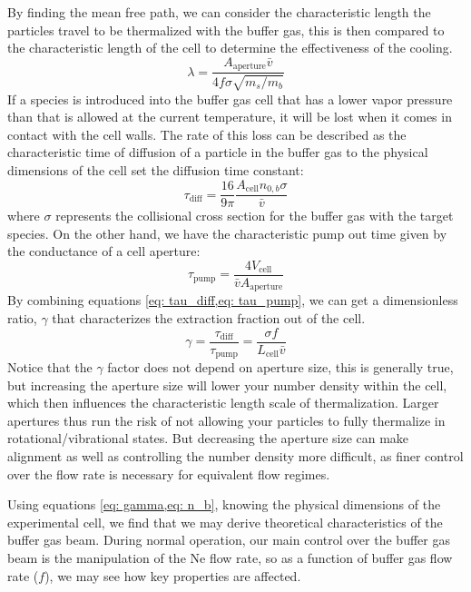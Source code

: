 By finding the mean free path, we can consider the characteristic length the particles travel to be thermalized with the buffer gas, this is then compared to the characteristic length of the cell to determine the effectiveness of the cooling.
\begin{equation*}
	\lambda = \frac{A_{\mathrm{aperture}} \bar{v}}{4 f \sigma \sqrt{m_s/m_b}}
\end{equation*}
If a species is introduced into the buffer gas cell that has a lower vapor pressure than that is allowed at the current temperature, it will be lost when it comes in contact with the cell walls. The rate of this loss can be described as the  characteristic time of diffusion of a particle in the buffer gas to the physical dimensions of the cell set the diffusion time constant:
\begin{equation}
	\tau_{\mathrm{diff}} = \frac{16}{9 \pi} \frac{A_{\mathrm{cell}} n_{0,b} \sigma}{\bar{v}} \label{eq: tau_diff}
\end{equation}
where $\sigma$ represents the collisional cross section for the buffer gas with the target species. On the other hand, we have the characteristic pump out time given by the conductance of a cell aperture:
\begin{equation}
	\tau_{\mathrm{pump}}=\frac{4V_{\mathrm{cell}}}{\bar{v}A_{\mathrm{aperture}}} \label{eq: tau_pump}
\end{equation}
By combining equations \cref{eq: tau_diff,eq: tau_pump}, we can get a dimensionless ratio, $\gamma$ that characterizes the extraction fraction out of the cell.
\begin{equation}
	\gamma = \frac{\tau_{\mathrm{diff}}}{\tau_{\mathrm{pump}}} = \frac{\sigma f}{L_{\mathrm{cell}} \bar{v}} \label{eq: gamma}
\end{equation}
Notice that the $\gamma$ factor does not depend on aperture size, this is generally true, but increasing the aperture size will lower your number density within the cell, which then influences the characteristic length scale of thermalization. Larger apertures thus run the risk of not allowing your particles to fully thermalize in rotational/vibrational states. But decreasing the aperture size can make alignment as well as controlling the number density more difficult, as finer control over the flow rate is necessary for equivalent flow regimes.

Using equations \cref{eq: gamma,eq: n_b}, knowing the physical dimensions of the experimental cell, we find that we may derive theoretical characteristics of the buffer gas beam. During normal operation, our main control over the buffer gas beam is the manipulation of the Ne flow rate, so as a function of buffer gas flow rate ($f$), we may see how key properties are affected.

